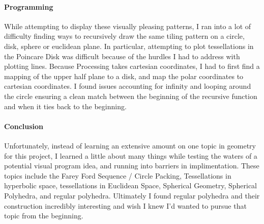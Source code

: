 \documentclass[12pt]{article}
\begin{document}
	\paragraph{Programming}
		While attempting to display these visually pleasing patterns, I ran into a lot of difficulty finding ways to recursively draw the same tiling pattern on a circle, disk, sphere or euclidean plane. In particular, attempting to plot tessellations in the Poincare Disk was difficult because of the hurdles I had to address with plotting lines. Because Processing takes cartesian coordinates, I had to first find a mapping of the upper half plane to a disk, and map the polar coordinates to cartesian coordinates. I found issues accounting for infinity and looping around the circle ensuring a clean match between the beginning of the recursive function and when it ties back to the beginning. 
		
	\paragraph{Conclusion}
		Unfortunately, instead of learning an extensive amount on one topic in geometry for this project, I learned a little about many things while testing the waters of a potential visual program idea, and running into barriers in implimentation. These topics include the Farey Ford Sequence / Circle Packing, Tessellations in hyperbolic space, tessellations in Euclidean Space, Spherical Geometry, Spherical Polyhedra, and regular polyhedra. Ultimately I found regular polyhedra and their construction incredibly interesting and wish I knew I'd wanted to pursue that topic from the beginning. 
	
\end{document}
